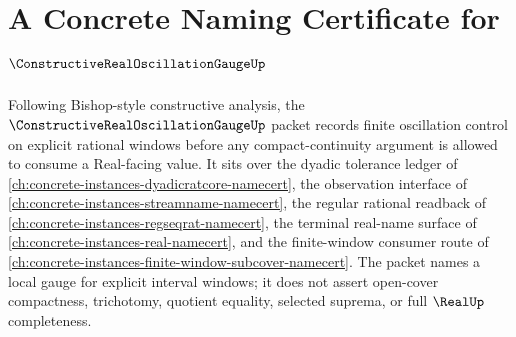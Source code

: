 \chapter{A Concrete Naming Certificate for $\ConstructiveRealOscillationGaugeUp$}
\label{ch:concrete-instances-constructive-real-oscillation-gauge-namecert}

Following Bishop-style constructive analysis, the $\ConstructiveRealOscillationGaugeUp$ packet records finite oscillation control on explicit rational windows before any compact-continuity argument is allowed to consume a Real-facing value. It sits over the dyadic tolerance ledger of \autoref{ch:concrete-instances-dyadicratcore-namecert}, the observation interface of \autoref{ch:concrete-instances-streamname-namecert}, the regular rational readback of \autoref{ch:concrete-instances-regseqrat-namecert}, the terminal real-name surface of \autoref{ch:concrete-instances-real-namecert}, and the finite-window consumer route of \autoref{ch:concrete-instances-finite-window-subcover-namecert}. The packet names a local gauge for explicit interval windows; it does not assert open-cover compactness, trichotomy, quotient equality, selected suprema, or full $\RealUp$ completeness.


